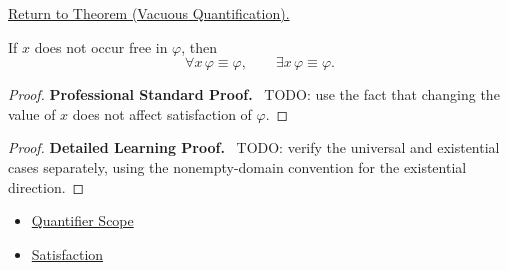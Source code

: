 \newpage
{}
\label{prf:vacuous}

\begin{remark*}[Return]
\hyperref[thm:vacuous]{Return to Theorem (Vacuous Quantification).}
\end{remark*}

\begin{theorem*}
If \(x\) does not occur free in \(\varphi\), then
\[
\forall x\,\varphi\equiv\varphi,
\qquad
\exists x\,\varphi\equiv\varphi.
\]
\end{theorem*}

\begin{proof}
\textbf{Professional Standard Proof.}~
TODO: use the fact that changing the value of \(x\) does not affect
satisfaction of \(\varphi\).
\end{proof}

\begin{proof}
\textbf{Detailed Learning Proof.}~
TODO: verify the universal and existential cases separately, using the
nonempty-domain convention for the existential direction.
\end{proof}

\begin{remark*}
\end{remark*}

\begin{dependencies}
\begin{itemize}
  \item \hyperref[def:quantifier-scope]{Quantifier Scope}
  \item \hyperref[def:fol-satisfaction]{Satisfaction}
\end{itemize}
\end{dependencies}

\clearpage
